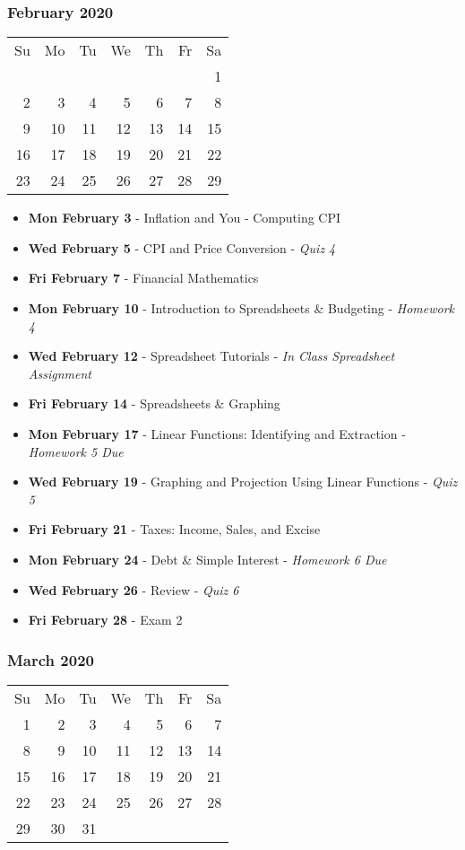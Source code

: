 \subsubsection*{February 2020}
\begin{tabular}{rrrrrrr}
Su & Mo & Tu & We & Th & Fr & Sa\\
   &    &    &    &    &    &  1\\ 
 2 &  3 &  4 &  5 &  6 &  7 &  8\\ 
 9 & 10 & 11 & 12 & 13 & 14 & 15\\ 
16 & 17 & 18 & 19 & 20 & 21 & 22\\ 
23 & 24 & 25 & 26 & 27 & 28 & 29\\ 
\end{tabular}
\begin{itemize}
\item\textbf{Mon February  3}
  - Inflation and You - Computing CPI
\item\textbf{Wed February  5}
  - CPI and Price Conversion - {\em Quiz 4}
\item\textbf{Fri February  7}
  - Financial Mathematics 
\item\textbf{Mon February 10}
  - Introduction to Spreadsheets \& Budgeting - {\em Homework 4}
\item\textbf{Wed February 12}
  - Spreadsheet Tutorials - {\em In Class Spreadsheet Assignment} 
\item\textbf{Fri February 14}
  - Spreadsheets \& Graphing  
\item\textbf{Mon February 17}
  - Linear Functions: Identifying and Extraction - {\em Homework 5 Due}
\item\textbf{Wed February 19}
  - Graphing and Projection Using Linear Functions - {\em Quiz 5} 
\item\textbf{Fri February 21}
  - Taxes: Income, Sales, and Excise 
\item\textbf{Mon February 24}
  - Debt \& Simple Interest  - {\em Homework 6 Due}
\item\textbf{Wed February 26}
  - Review - {\em Quiz 6}
\item\textbf{Fri February 28}
  - Exam 2 
\end{itemize}
\hrulefill

\subsubsection*{March 2020}
\begin{tabular}{rrrrrrr}
Su & Mo & Tu & We & Th & Fr & Sa\\
 1 &  2 &  3 &  4 &  5 &  6 &  7\\ 
 8 &  9 & 10 & 11 & 12 & 13 & 14\\ 
15 & 16 & 17 & 18 & 19 & 20 & 21\\ 
22 & 23 & 24 & 25 & 26 & 27 & 28\\
29 & 30 & 31 &    &    &    & \\
\end{tabular}

